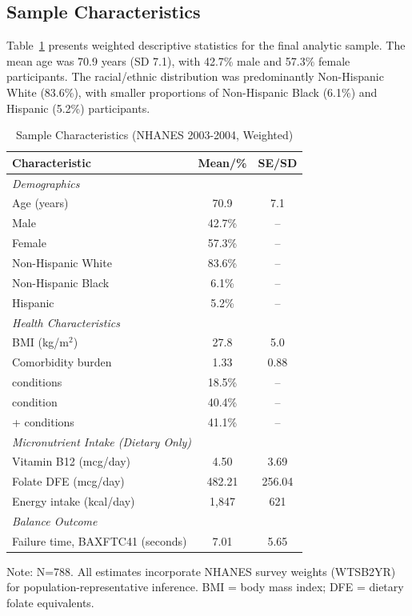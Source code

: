 \documentclass[11pt,a4paper]{article}
\begin{document}
\subsection{Sample Characteristics}

Table~\ref{tab:characteristics} presents weighted descriptive statistics for the final analytic sample. The mean age was 70.9 years (SD 7.1), with 42.7\% male and 57.3\% female participants. The racial/ethnic distribution was predominantly Non-Hispanic White (83.6\%), with smaller proportions of Non-Hispanic Black (6.1\%) and Hispanic (5.2\%) participants.

\begin{table}[htbp]
\centering
\caption{Sample Characteristics (NHANES 2003-2004, Weighted)}
\label{tab:characteristics}
\begin{tabular}{lcc}
\toprule
\textbf{Characteristic} & \textbf{Mean/\%} & \textbf{SE/SD} \\
\midrule
\multicolumn{3}{l}{\textit{Demographics}} \\
Age (years) & 70.9 & 7.1 \\
\quad Male & 42.7\% & -- \\
\quad Female & 57.3\% & -- \\
\quad Non-Hispanic White & 83.6\% & -- \\
\quad Non-Hispanic Black & 6.1\% & -- \\
\quad Hispanic & 5.2\% & -- \\
\midrule
\multicolumn{3}{l}{\textit{Health Characteristics}} \\
BMI (kg/m$^2$) & 27.8 & 5.0 \\
Comorbidity burden & 1.33 & 0.88 \\
\quad 0 conditions & 18.5\% & -- \\
\quad 1 condition & 40.4\% & -- \\
\quad 2+ conditions & 41.1\% & -- \\
\midrule
\multicolumn{3}{l}{\textit{Micronutrient Intake (Dietary Only)}} \\
Vitamin B12 (mcg/day) & 4.50 & 3.69 \\
Folate DFE (mcg/day) & 482.21 & 256.04 \\
Energy intake (kcal/day) & 1,847 & 621 \\
\midrule
\multicolumn{3}{l}{\textit{Balance Outcome}} \\
Failure time, BAXFTC41 (seconds) & 7.01 & 5.65 \\
\bottomrule
\end{tabular}
\begin{flushleft}
\footnotesize{Note: N=788. All estimates incorporate NHANES survey weights (WTSB2YR) for population-representative inference. BMI = body mass index; DFE = dietary folate equivalents.}
\end{flushleft}
\end{table}
\end{document}
